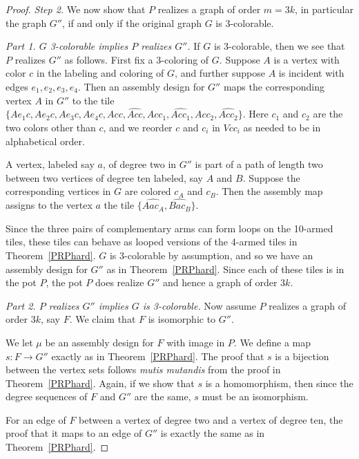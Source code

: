 \documentclass{elsarticle}
\theoremstyle{definition}
\theoremstyle{remark}
\theoremstyle{plain}
\theoremstyle{plain}
\begin{document}
\begin{proof}
\bigskip 

\emph{Step 2.}  
We now show that $P$ realizes a graph of order $m = 3k$, in particular the graph $G''$, if and only if the original graph $G$ is 3-colorable.

\emph{Part 1.  $G$ 3-colorable implies $P$ realizes $G''$.} If $G$ is 3-colorable, then we see that $P$ realizes $G''$ as follows. First fix a 3-coloring of $G$.  Suppose $A$ is a vertex with color $c$ in the labeling and coloring of $G$, and further suppose $A$ is incident with edges $e_1, e_2, e_3, e_4$.  Then an assembly design for $G''$ maps the corresponding vertex  $A$ in $G''$ to the tile  $\{Ae_1c, Ae_2c, Ae_3c, Ae_4c, Acc, \widehat{Acc}, Acc_1, \widehat{Acc_1}, Acc_2, \widehat{Acc_2}\}$.  Here $c_1$ and $c_2$ are the two colors other than $c$, and we reorder $c$ and $c_i$ in $Vcc_i$ as needed to be in alphabetical order.   

A vertex, labeled say $a$, of degree two in $G''$ is part of a path of length two between two vertices of degree ten labeled, say $A$ and $B$.  Suppose the corresponding vertices in $G$ are colored $c_A$ and $c_B$.  Then the assembly map assigns to the vertex $a$ the tile $\{\widehat{Aac_A}, \widehat{Bac_B}\}$.  

Since the three pairs of complementary arms can form loops on the 10-armed tiles, these tiles can behave as looped versions of the 4-armed tiles in Theorem~\ref{PRPhard}.  $G$ is 3-colorable by assumption, and so we have an assembly design for $G''$ as in Theorem~\ref{PRPhard}.  Since each of these tiles is in the pot $P$, the pot $P$ does realize $G''$ and hence a graph of order $3k$. 

\bigskip

\emph{Part 2. $P$ realizes $G''$ implies $G$ is 3-colorable.} Now assume $P$ realizes a graph of order $3k$, say $F$.   We claim that $F$ is isomorphic to $G''$.  

We let $\mu$ be an assembly design for $F$ with image in $P$.  We define a map $s: F \rightarrow G''$ exactly as in Theorem~\ref{PRPhard}.  The proof that $s$ is a bijection between the vertex sets follows \emph{mutis mutandis} from the proof in Theorem~\ref{PRPhard}.   Again, if we show that $s$ is a homomorphism, then since the degree sequences of $F$ and $G''$ are the same, $s$ must be an isomorphism.

For an edge of $F$ between a vertex of degree two and a vertex of degree ten, the proof that it maps to an edge of $G''$ is exactly the same as in Theorem~\ref{PRPhard}. 


\end{proof}
\end{document}
